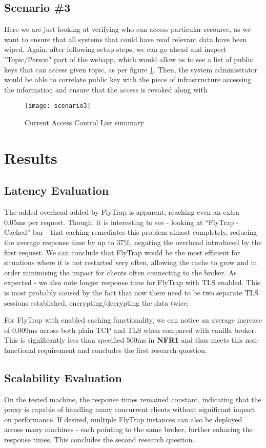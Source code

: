 \subsection{Scenario \#3}
Here we are just looking at verifying who can access particular resource, as we want to ensure that all systems that could have read relevant data have been wiped. Again, after following setup steps, we can go ahead and inspect "Topic/Person" part of the webapp, which would allow us to see a list of public keys that can access given topic, as per figure \ref{fig:scenario3}. Then, the system administrator would be able to correlate public key with the piece of infrastructure accessing the information and ensure that the access is revoked along with 
\begin{figure}[h]
    \centering
    \texttt{[image: scenario3]}
    \caption{Current Access Control List summary}
    \label{fig:scenario3}
\end{figure}
\section{Results}
\subsection{Latency Evaluation}
The added overhead added by FlyTrap is apparent, reaching even an extra 0.05ms per request. Though, it is interesting to see - looking at ``FlyTrap - Cached'' bar - that caching remediates this problem almost completely, reducing the average response time by up to 37\%, negating the overhead introduced by the first request. We can conclude that FlyTrap would be the most efficient for situations where it is not restarted very often, allowing the cache to grow and in order minimising the impact for clients often connecting to the broker. As expected - we also note longer response time for FlyTrap with TLS enabled. This is most probably caused by the fact that now there need to be two separate TLS sessions established, encrypting/decrypting the data twice.

For FlyTrap with enabled caching functionality, we can notice an average increase of 0.009ms across both plain TCP and TLS when compared with vanilla broker. This is significantly less than specified 500ms in \textbf{NFR1} and thus meets this non-functional requirement and concludes the first research question.
\subsection{Scalability Evaluation}
On the tested machine, the response times remained constant, indicating that the proxy is capable of handling many concurrent clients without significant impact on performance. If desired, multiple FlyTrap instances can also be deployed across many machines - each pointing to the same broker, further enhacing the response times. This concludes the second research question.
